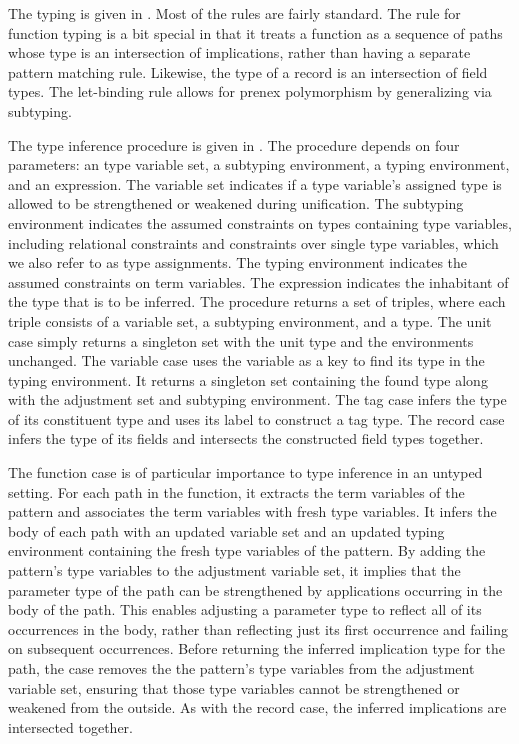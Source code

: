 \documentclass[acmsmall]{acmart}
\theoremstyle{definition}
\begin{document}
The typing is given in .
Most of the rules are fairly standard. 
The rule for function typing is a bit special in that
it treats a function as a sequence of paths whose type is an intersection of implications,
rather than having a separate pattern matching rule. 
Likewise, the type of a record is an intersection of field types.
The let-binding rule allows for prenex polymorphism by generalizing via subtyping. 

The type inference procedure is given in .
The procedure depends on four parameters: an type variable set, a subtyping environment, 
a typing environment, and an expression.
The variable set indicates if a type variable's assigned type is allowed to be strengthened or weakened  
during unification.
The subtyping environment indicates the assumed constraints on types containing type variables,
including relational constraints and constraints over single type variables, 
which we also refer to as type assignments.
The typing environment indicates the assumed constraints on term variables.
The expression indicates the inhabitant of the type that is to be inferred.
The procedure returns a set of triples, where each triple consists of a variable set, a subtyping environment,
and a type.
The unit case simply returns a singleton set with the unit type and the environments unchanged. 
The variable case uses the variable as a key to find its type in the typing environment. 
It returns a singleton set containing the found type along with the adjustment set and subtyping environment.
The tag case infers the type of its constituent type and uses its label to construct a tag type.
The record case infers the type of its fields and intersects the constructed field types together.

The function case is of particular importance to type inference in an untyped setting.
For each path in the function, it extracts the term variables of the pattern and associates 
the term variables with fresh type variables. It infers the body of each path 
with an updated variable set and an updated typing environment containing the fresh
type variables of the pattern. By adding the pattern's type variables to the adjustment variable set,
it implies that the parameter type of the path can be strengthened by applications
occurring in the body of the path. This enables adjusting a parameter type to reflect all of its 
occurrences in the body, 
rather than reflecting just its first occurrence and failing on subsequent occurrences. 
Before returning the inferred implication type for the path, the case removes
the the pattern's type variables from the adjustment variable set, ensuring
that those type variables cannot be strengthened or weakened from the outside. 
As with the record case, the inferred implications are intersected together.
\end{document}
